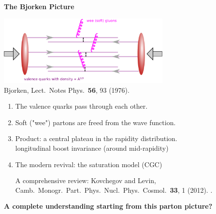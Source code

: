\documentclass[9pt,a4paper,unknownkeysallowed,xcolor=dvipsnames,aspectratio=43]{beamer}
\begin{document}
\begin{frame}{\bf\huge The Bjorken Picture}	\vspace{4mm}
\begin{center}
\includegraphics[width=0.65\textwidth]{fig/Bjorken}\\
{\tiny  {\color{teablue}
Bjorken,
  Lect.\ Notes Phys.\  {\bf 56}, 93 (1976).
  }}
\end{center}
\begin{enumerate}
\item{\large The valence quarks pass through each other.}
\vspace{2mm}
\item{\large Soft ("wee") partons are freed from the wave function.}
\vspace{2mm}
\item{\large Product: a central plateau in the rapidity distribution.}\\
\vspace{1mm}
    longitudinal boost invariance (around mid-rapidity)
\vspace{1mm}
\item{\large The modern revival: the saturation model (CGC)}
\begin{center}
    {\tiny  A comprehensive review: {\color{teablue}
  Kovchegov and Levin,
  Camb.\ Monogr.\ Part.\ Phys.\ Nucl.\ Phys.\ Cosmol.\  {\bf 33}, 1 (2012).
.
  }}
\end{center}
\end{enumerate}
\vspace{1mm}
\begin{center}
{\bf\large A complete understanding starting from this parton picture?}
\end{center}

\end{frame}
%
\end{document}
